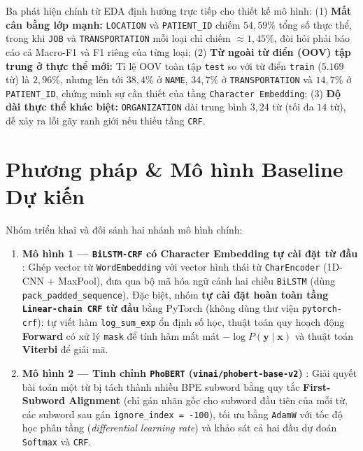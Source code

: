 \documentclass[11pt,a4paper,twocolumn]{article}
\begin{document}
Ba phát hiện chính từ EDA định hướng trực tiếp cho thiết kế mô hình:
(1) \textbf{Mất cân bằng lớp mạnh:} \texttt{LOCATION} và \texttt{PATIENT\_ID} chiếm $54{,}59\%$ tổng số thực thể, trong khi \texttt{JOB} và \texttt{TRANSPORTATION} mỗi loại chỉ chiếm $\approx 1{,}45\%$, đòi hỏi phải báo cáo cả Macro-F1 và F1 riêng của từng loại;
(2) \textbf{Từ ngoài từ điển (OOV) tập trung ở thực thể mới:} Tỉ lệ OOV toàn tập \texttt{test} so với từ điển \texttt{train} ($5.169$ từ) là $2{,}96\%$, nhưng lên tới $38{,}4\%$ ở \texttt{NAME}, $34{,}7\%$ ở \texttt{TRANSPORTATION} và $14{,}7\%$ ở \texttt{PATIENT\_ID}, chứng minh sự cần thiết của tầng \texttt{Character Embedding};
(3) \textbf{Độ dài thực thể khác biệt:} \texttt{ORGANIZATION} dài trung bình $3{,}24$ từ (tối đa $14$ từ), dễ xảy ra lỗi gãy ranh giới nếu thiếu tầng \texttt{CRF}.

\section{Phương pháp \& Mô hình Baseline Dự kiến}
Nhóm triển khai và đối sánh hai nhánh mô hình chính:
\begin{enumerate}
  \item \textbf{Mô hình 1 — \texttt{BiLSTM-CRF} có Character Embedding tự cài đặt từ đầu} \citep{lample-etal-2016-neural,ma-hovy-2016-end}: Ghép vector từ \texttt{WordEmbedding} với vector hình thái từ \texttt{CharEncoder} (1D-CNN + MaxPool), đưa qua bộ mã hóa ngữ cảnh hai chiều \texttt{BiLSTM} (dùng \texttt{pack\_padded\_sequence}). Đặc biệt, nhóm \textbf{tự cài đặt hoàn toàn tầng \texttt{Linear-chain CRF} từ đầu} bằng PyTorch (không dùng thư viện \texttt{pytorch-crf}): tự viết hàm \texttt{log\_sum\_exp} ổn định số học, thuật toán quy hoạch động \textbf{Forward} có xử lý \texttt{mask} để tính hàm mất mát $-\log P(\mathbf{y}\mid\mathbf{x})$ và thuật toán \textbf{Viterbi} để giải mã.
  \item \textbf{Mô hình 2 — Tinh chỉnh \texttt{PhoBERT} (\texttt{vinai/phobert-base-v2})} \citep{nguyen-nguyen-2020-phobert}: Giải quyết bài toán một từ bị tách thành nhiều BPE subword bằng quy tắc \textbf{First-Subword Alignment} (chỉ gán nhãn gốc cho subword đầu tiên của mỗi từ, các subword sau gán \texttt{ignore\_index = -100}), tối ưu bằng \texttt{AdamW} với tốc độ học phân tầng (\textit{differential learning rate}) và khảo sát cả hai đầu dự đoán \texttt{Softmax} và \texttt{CRF}.
\end{enumerate}
\end{document}
